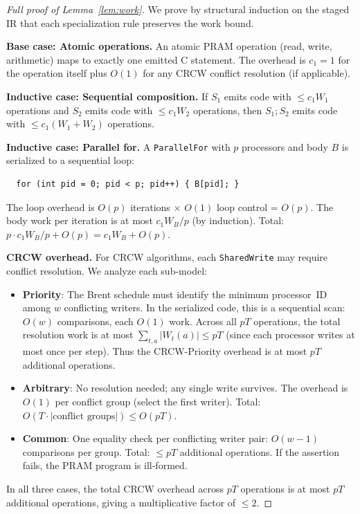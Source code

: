 \documentclass[11pt]{article}
\begin{document}
\begin{proof}[Full proof of Lemma~\ref{lem:work}]
We prove by structural induction on the staged IR that each specialization
rule preserves the work bound.

\textbf{Base case: Atomic operations.}
An atomic PRAM operation (read, write, arithmetic) maps to exactly one
emitted C statement.  The overhead is $c_1 = 1$ for the operation itself
plus $O(1)$ for any CRCW conflict resolution (if applicable).

\textbf{Inductive case: Sequential composition.}
If $S_1$ emits code with $\le c_1 W_1$ operations and $S_2$ emits code
with $\le c_1 W_2$ operations, then $S_1; S_2$ emits code with
$\le c_1(W_1 + W_2)$ operations.

\textbf{Inductive case: Parallel for.}
A \texttt{ParallelFor} with $p$ processors and body $B$ is serialized to
a sequential loop:
\begin{verbatim}
  for (int pid = 0; pid < p; pid++) { B[pid]; }
\end{verbatim}
The loop overhead is $O(p)$ iterations $\times$ $O(1)$ loop control
= $O(p)$.  The body work per iteration is at most $c_1 W_B / p$ (by
induction).  Total: $p \cdot c_1 W_B / p + O(p) = c_1 W_B + O(p)$.

\textbf{CRCW overhead.}
For CRCW algorithms, each \texttt{SharedWrite} may require conflict
resolution.  We analyze each sub-model:
\begin{itemize}
\item \textbf{Priority}: The Brent schedule must identify the minimum
  processor~ID among $w$ conflicting writers.  In the serialized code,
  this is a sequential scan: $O(w)$ comparisons, each $O(1)$ work.
  Across all $pT$ operations, the total resolution work is at most
  $\sum_{t,a} |W_t(a)| \le pT$ (since each processor writes at most
  once per step).  Thus the CRCW-Priority overhead is at most $pT$
  additional operations.
\item \textbf{Arbitrary}: No resolution needed; any single write
  survives.  The overhead is $O(1)$ per conflict group (select the
  first writer).  Total: $O(T \cdot |\text{conflict groups}|) \le O(pT)$.
\item \textbf{Common}: One equality check per conflicting writer
  pair: $O(w-1)$ comparisons per group.  Total: $\le pT$ additional
  operations.  If the assertion fails, the PRAM program is ill-formed.
\end{itemize}
In all three cases, the total CRCW overhead across $pT$ operations is at
most $pT$ additional operations, giving a multiplicative factor of
$\le 2$.


\end{proof}
\end{document}
